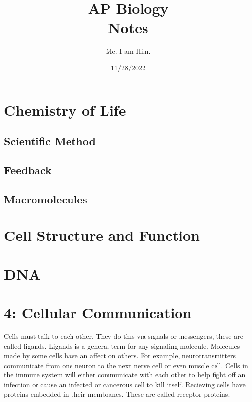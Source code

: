 \documentclass{report}
\title{\Huge{AP Biology}\\ Notes}
\author{Me. I am Him.}
\date{11/28/2022}
\begin{document}
\maketitle
\newpage
{}
\tableofcontents
\pagebreak

\thispagestyle{empty}
\newpage
\listoffigures
\clearpage
{}


\chapter{Chemistry of Life}
\section{Scientific Method}
\section{Feedback}
\section{Macromolecules}


\newpage
\chapter{Cell Structure and Function}\label{ch:cell-structure-and-function}



\chapter{DNA}\label{ch:dna}


\chapter{4: Cellular Communication}\label{ch:Cellular Comm.}

Cells must talk	to each other. They do this via signals or messengers, these are called ligands. Ligands is a general term for any signaling molecule.
Molecules made by some cells have an affect on others. For example, neurotransmitters communicate from one neuron to the next nerve cell or even muscle cell.
Cells in the immune system will either communicate with each other to help fight off an infection or cause an infected or cancerous cell to kill itself.
Recieving cells have proteins embedded in their membranes. These are called receptor proteins.
\end{document}
